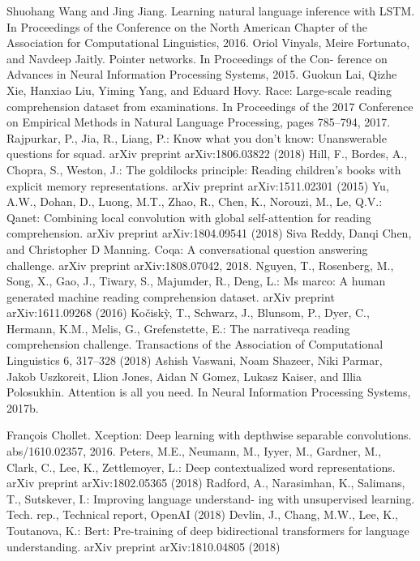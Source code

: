 \documentclass{article}
\begin{document}
\begin{multicols}{2}
\begin{thebibliography}{99}
    Shuohang Wang and Jing Jiang. Learning natural language inference with LSTM. In Proceedings of
    the Conference on the North American Chapter of the Association for Computational Linguistics,
    2016.
    Oriol Vinyals, Meire Fortunato, and Navdeep Jaitly. Pointer networks. In Proceedings of the Con-
    ference on Advances in Neural Information Processing Systems, 2015.
    Guokun Lai, Qizhe Xie, Hanxiao Liu, Yiming Yang, and Eduard Hovy. Race: Large-scale
    reading comprehension dataset from examinations. In Proceedings of the 2017 Conference
    on Empirical Methods in Natural Language Processing, pages 785–794, 2017.
    Rajpurkar, P., Jia, R., Liang, P.: Know what you don’t know: Unanswerable questions for
    squad. arXiv preprint arXiv:1806.03822 (2018)
    Hill, F., Bordes, A., Chopra, S., Weston, J.: The goldilocks principle: Reading children’s
    books with explicit memory representations. arXiv preprint arXiv:1511.02301 (2015)
    Yu, A.W., Dohan, D., Luong, M.T., Zhao, R., Chen, K., Norouzi, M., Le, Q.V.: Qanet:
    Combining local convolution with global self-attention for reading comprehension. arXiv
    preprint arXiv:1804.09541 (2018)
    Siva Reddy, Danqi Chen, and Christopher D Manning. Coqa: A conversational question answering
    challenge. arXiv preprint arXiv:1808.07042, 2018.
    Nguyen, T., Rosenberg, M., Song, X., Gao, J., Tiwary, S., Majumder, R., Deng, L.:
    Ms marco: A human generated machine reading comprehension dataset. arXiv preprint
    arXiv:1611.09268 (2016)
    Kočiskỳ, T., Schwarz, J., Blunsom, P., Dyer, C., Hermann, K.M., Melis, G., Grefenstette,
    E.: The narrativeqa reading comprehension challenge. Transactions of the Association of
    Computational Linguistics 6, 317–328 (2018)
    Ashish Vaswani, Noam Shazeer, Niki Parmar, Jakob Uszkoreit, Llion Jones, Aidan N Gomez,
    Lukasz Kaiser, and Illia Polosukhin. Attention is all you need. In Neural Information Processing
    Systems, 2017b.

    François Chollet. Xception: Deep learning with depthwise separable convolutions.
    abs/1610.02357, 2016.
    Peters, M.E., Neumann, M., Iyyer, M., Gardner, M., Clark, C., Lee, K., Zettlemoyer, L.:
    Deep contextualized word representations. arXiv preprint arXiv:1802.05365 (2018)
    Radford, A., Narasimhan, K., Salimans, T., Sutskever, I.: Improving language understand-
    ing with unsupervised learning. Tech. rep., Technical report, OpenAI (2018)
    Devlin, J., Chang, M.W., Lee, K., Toutanova, K.: Bert: Pre-training of deep bidirectional
    transformers for language understanding. arXiv preprint arXiv:1810.04805 (2018)


\end{thebibliography}
\end{multicols}
\end{document}
